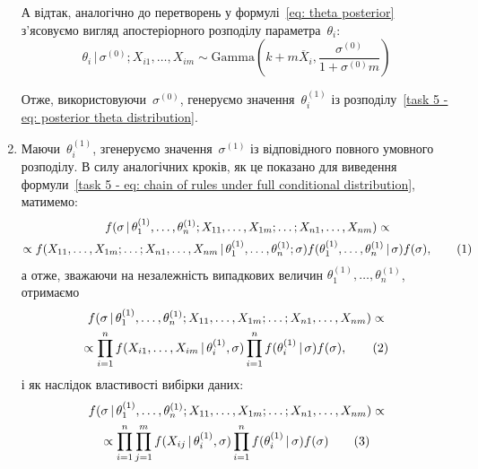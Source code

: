 \begin{enumerate}
        А відтак, аналогічно до перетворень у формулі~\eqref{eq: theta posterior} з'ясовуємо вигляд апостеріорного розподілу параметра~$\theta_i:$
        \begin{equation}\label{task 5 - eq: posterior theta distribution}
            \theta_i \,|\, \sigma^{(0)}; X_{i1},\ldots,X_{im} \sim \mathrm{Gamma}\left( k+m\overline{X}_i,\frac{\sigma^{(0)}}{1+\sigma^{(0)}m} \right)
        \end{equation}

        Отже, використовуючи~$\sigma^{(0)}$, генеруємо значення~$\theta_i^{(1)}$ із розподілу~\eqref{task 5 - eq: posterior theta distribution}.

    \item Маючи~$\theta_i^{(1)}$, згенеруємо значення~$\sigma^{(1)}$ із відповідного повного умовного розподілу. В силу аналогічних кроків, як це показано для виведення формули~\eqref{task 5 - eq: chain of rules under full conditional distribution}, матимемо:
        \begin{multline*}
            f(\sigma \,|\, \theta_1^{(1)},\ldots,\theta_n^{(1)}; X_{11},\ldots,X_{1m};\ldots;X_{n1},\ldots,X_{nm}) \propto \\
            \propto f(X_{11},\ldots,X_{1m};\ldots;X_{n1},\ldots,X_{nm} \,|\, \theta_1^{(1)},\ldots,\theta_n^{(1)}; \sigma) f(\theta_1^{(1)},\ldots,\theta_n^{(1)} \,|\, \sigma) f(\sigma), \stepcounter{equation}\tag{\theequation}
        \end{multline*}
        а отже, зважаючи на незалежність випадкових величин $\theta_1^{(1)},\ldots,\theta_n^{(1)}$, отримаємо
        \begin{multline*}
            f(\sigma \,|\, \theta_1^{(1)},\ldots,\theta_n^{(1)}; X_{11},\ldots,X_{1m};\ldots;X_{n1},\ldots,X_{nm}) \propto \\
            \propto \prod_{i=1}^{n} f(X_{i1},\ldots,X_{im} \,|\, \theta_i^{(1)}, \sigma) \prod_{i=1}^{n} f(\theta_i^{(1)} \,|\, \sigma) f(\sigma), \stepcounter{equation}\tag{\theequation}
        \end{multline*}
        і як наслідок властивості вибірки даних:
        \begin{multline*}
            f(\sigma \,|\, \theta_1^{(1)},\ldots,\theta_n^{(1)}; X_{11},\ldots,X_{1m};\ldots;X_{n1},\ldots,X_{nm}) \propto \\
            \propto \prod_{i=1}^{n} \prod_{j=1}^{m} f(X_{ij} \,|\, \theta_i^{(1)}, \sigma) \prod_{i=1}^{n} f(\theta_i^{(1)} \,|\, \sigma) f(\sigma) \stepcounter{equation}\tag{\theequation}
        \end{multline*}


\end{enumerate}
